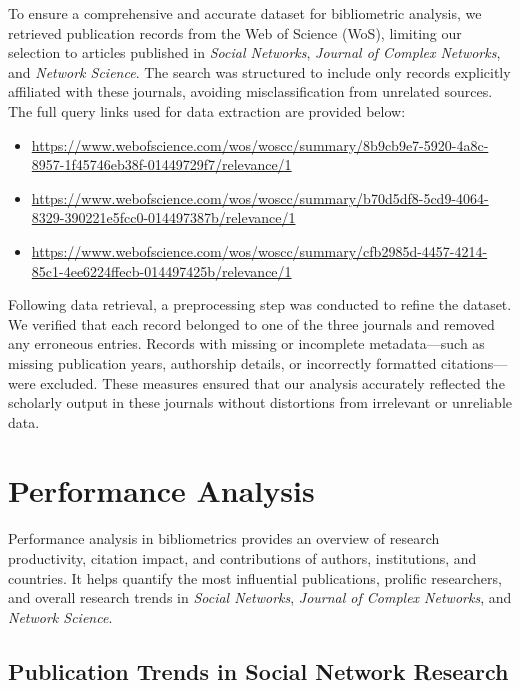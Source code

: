 \documentclass[twocolumn]{article}
\begin{document}
	To ensure a comprehensive and accurate dataset for bibliometric analysis, we retrieved publication records from the Web of Science (WoS), limiting our selection to articles published in \textit{Social Networks}, \textit{Journal of Complex Networks}, and \textit{Network Science}. The search was structured to include only records explicitly affiliated with these journals, avoiding misclassification from unrelated sources. The full query links used for data extraction are provided below:
	\begin{itemize}
		\item \url{https://www.webofscience.com/wos/woscc/summary/8b9cb9e7-5920-4a8c-8957-1f45746eb38f-01449729f7/relevance/1}
		\item 	\url{https://www.webofscience.com/wos/woscc/summary/b70d5df8-5cd9-4064-8329-390221e5fcc0-014497387b/relevance/1}
		\item 	\url{https://www.webofscience.com/wos/woscc/summary/cfb2985d-4457-4214-85c1-4ee6224ffecb-014497425b/relevance/1}
	\end{itemize}
	
	Following data retrieval, a preprocessing step was conducted to refine the dataset. We verified that each record belonged to one of the three journals and removed any erroneous entries. Records with missing or incomplete metadata—such as missing publication years, authorship details, or incorrectly formatted citations—were excluded. These measures ensured that our analysis accurately reflected the scholarly output in these journals without distortions from irrelevant or unreliable data.
	
	\section{Performance Analysis}\label{Performance Analysis}
	
	Performance analysis in bibliometrics provides an overview of research productivity, citation impact, and contributions of authors, institutions, and countries. It helps quantify the most influential publications, prolific researchers, and overall research trends in \textit{Social Networks}, \textit{Journal of Complex Networks}, and \textit{Network Science}.
	
	\subsection{Publication Trends in Social Network Research}
	
\end{document}
